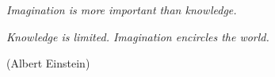 \begin{epigrafe}
    \vspace*{\fill}
	\begin{flushright}
		\textit{Imagination is more important than knowledge.}
		
		\textit{Knowledge is limited. Imagination encircles the world.}
		
		(Albert Einstein)
	\end{flushright}
\end{epigrafe}